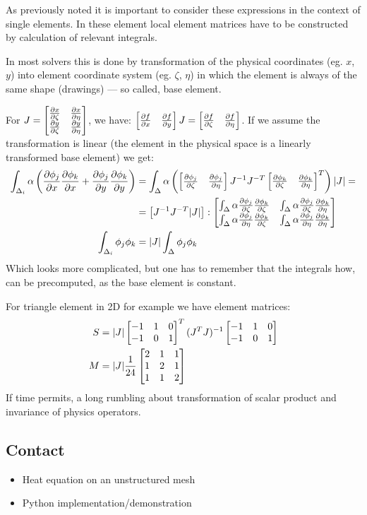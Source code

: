 \documentclass[12pt]{article}
\begin{document}
As previously noted it is important to consider these expressions in the context of single elements. In these element local element matrices have to be constructed by calculation of relevant integrals.

In most solvers this is done by transformation of the physical coordinates (eg. $x$, $y$) into element coordinate system (eg. $\zeta$, $\eta$) in which the element is always of the same shape (drawings) --- so called, base element.

For $J = \left[\begin{matrix}\frac{\partial x}{\partial \zeta} & \frac{\partial x}{\partial \eta}\\\frac{\partial y}{\partial \zeta} & \frac{\partial y}{\partial \eta}\end{matrix}\right]$, we have: $\left[\begin{matrix}\frac{\partial f}{\partial x}&\frac{\partial f}{\partial y}\end{matrix}\right]J = \left[\begin{matrix}\frac{\partial f}{\partial \zeta}&\frac{\partial f}{\partial \eta}\end{matrix}\right]$. If we assume the transformation is linear (the element in the physical space is a linearly transformed base element) we get:
\newcommand{\baseelementint}[2]{\int_{\Delta}\alpha\rr{\phi_j}{#1}\rr{\phi_k}{#2}}
\begin{align*}    
\int_{\Delta_i}\alpha\left(\rr{\phi_j}{x}\rr{\phi_k}{x} + \rr{\phi_j}{y}\rr{\phi_k}{y}\right) &= \int_{\Delta}\alpha\left(\mat{\rr{\phi_j}{\zeta}&\rr{\phi_j}{\eta}}J^{-1}J^{-T}\mat{\rr{\phi_k}{\zeta}&\rr{\phi_k}{\eta}}^T\right)|J| =\\
&= \left[J^{-1}J^{-T}|J|\right]:\mat{\baseelementint{\zeta}{\zeta} & \baseelementint{\zeta}{\eta} \\ \baseelementint{\eta}{\zeta} & \baseelementint{\eta}{\eta}}\\
\int_{\Delta_i}\phi_j\phi_k &= |J|\int_{\Delta}\phi_j\phi_k
\end{align*}
Which looks more complicated, but one has to remember that the integrals how, can be precomputed, as the base element is constant.

For triangle element in 2D for example we have element matrices:
\begin{align*}
    S &= |J|\left[\begin{matrix}-1&1&0\\-1&0&1\end{matrix}\right]^T(J^TJ)^{-1}\left[\begin{matrix}-1&1&0\\-1&0&1\end{matrix}\right]\\
    M &= |J|\frac{1}{24}\left[\begin{matrix}2&1&1\\1&2&1\\1&1&2\end{matrix}\right]\\
\end{align*}
If time permits, a long rumbling about transformation of scalar product and invariance of physics operators.

\newpage


\subsection*{Contact}
\begin{itemize}
    \item Heat equation on an unstructured mesh
    \item Python implementation/demonstration
\end{itemize}

\end{document}
